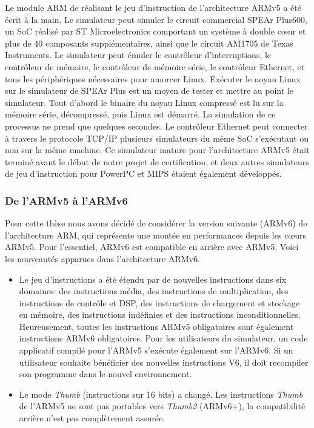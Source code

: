 Le module ARM de \simsoc réalisant le jeu d'instruction de l'architecture
ARMv5 a été écrit à la main.
Le simulateur peut simuler le circuit commercial SPEAr Plus600,
un SoC réalisé par ST Microelectronics comportant un système à double 
c{\oe}ur et plus de 40 composants supplémentaires,
ainsi que le circuit AM1705 de Texas Instruments.
Le simulateur peut émuler le contrôleur d'interruptions,
le contrôleur de mémoire,
le contrôleur de mémoire série,
le contrôleur Ethernet,
et tous les périphériques nécessaires pour amorcer Linux.
Exécuter le noyau Linux sur le simulateur de SPEAr Plus
est un moyen de tester et mettre au point le simulateur.
Tout d'abord le binaire du noyau Linux compressé est lu
sur la mémoire série, décompressé, puis Linux est démarré.
La simulation de ce processus ne prend que quelques secondes.
Le contrôleur Ethernet peut connecter à travers le protocole TCP/IP
plusieurs simulateurs du même SoC s'exécutant ou non sur la même machine.
Ce simulateur mature pour l'architecture ARMv5 était terminé
avant le début de notre projet de certification,
et deux autres simulateurs de jeu d'instruction pour PowerPC
et MIPS étaient également développés.


\subsubsection*{De  l'ARMv5 à l'ARMv6}

Pour cette thèse nous avons décidé de considérer la version suivante
(ARMv6) de l'architecture ARM, qui représente une montée en performances
depuis les c{\oe}urs ARMv5.
Pour l'essentiel, ARMv6 est compatible en arrière avec ARMv5.
Voici les nouveautés apparues dans l'architecture ARMv6.

\begin{itemize}
\item
  Le jeu d'instructions a été étendu par de nouvelles instructions
  dans six domaines: des instructions média, des instructions de multiplication,
  des instructions de contrôle et DSP,
  des instructions de chargement et stockage en mémoire,
  des instructions indéfinies et
  des instructions inconditionnelles.
  Heureusement, toutes les instructions ARMv5 obligatoires sont également
  instructions ARMv6 obligatoires.
  Pour les utilisateurs du simulateur, un code applicatif compilé pour
  l'ARMv5 s'exécute également sur l'ARMv6.
  Si un utilisateur souhaite bénéficier des nouvelles instructions V6,
  il doit recompiler son programme dans le nouvel environnement.
\item 
  Le mode \emph{Thumb} (instructions sur 16 bits) a changé.
  Les instructions  \emph{Thumb} de l'ARMv5 ne sont pas portables vers
  \emph{Thumb2} (ARMv6+), 
  la compatibilité arrière n'est pas complètement assurée.
\end{itemize}


